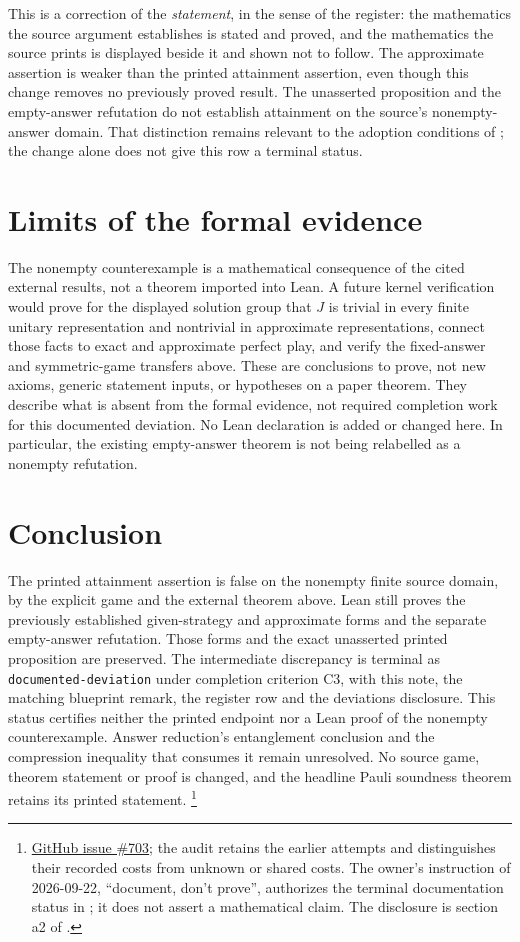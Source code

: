 \documentclass[11pt]{article}
\renewcommand{\ghissue}[1]{%
  \href{https://github.com/Dengnifer/MIPStarRE-QPBT/issues/#1}{GitHub issue \##1}}
\begin{document}
This is a correction of the \emph{statement}, in the sense of the register:
the mathematics the source argument establishes is stated and proved, and the
mathematics the source prints is displayed beside it and shown not to follow.
The approximate assertion is weaker than the printed attainment assertion,
even though this change removes no previously proved result. The unasserted
proposition and the empty-answer refutation do not establish attainment on the
source's nonempty-answer domain. That distinction remains relevant to the
adoption conditions of ; the change alone
does not give this row a terminal status.

\section{Limits of the formal evidence}

The nonempty counterexample is a mathematical consequence of the cited
external results, not a theorem imported into Lean. A future kernel verification
would prove for the displayed solution group that $J$ is trivial in every finite
unitary representation and nontrivial in approximate representations, connect
those facts to exact and approximate perfect play, and verify the fixed-answer
and symmetric-game transfers above. These are conclusions to prove, not new
axioms, generic statement inputs, or hypotheses on a paper theorem. They
describe what is absent from the formal evidence, not required completion work
for this documented deviation. No Lean declaration is added or changed here.
In particular, the existing empty-answer theorem is not being relabelled as a
nonempty refutation.

\section{Conclusion}

The printed attainment assertion is false on the nonempty finite source
domain, by the explicit game and the external theorem above. Lean still
proves the previously established given-strategy and approximate forms and
the separate empty-answer refutation. Those forms and the exact unasserted
printed proposition are preserved. The intermediate discrepancy is terminal
as \texttt{documented-deviation} under completion criterion C3, with this note,
the matching blueprint remark, the register row and the deviations disclosure.
This status certifies neither the printed endpoint nor a Lean proof of the
nonempty counterexample. Answer reduction's entanglement conclusion and the
compression inequality that consumes it remain unresolved. No source game,
theorem statement or proof is changed, and the headline Pauli soundness theorem
retains its printed statement.%
\footnote{\ghissue{703}; the audit retains the earlier attempts and distinguishes
their recorded costs from unknown or shared costs. The owner's instruction of
2026-09-22, ``document, don't prove'', authorizes the terminal documentation
status in ; it does not assert a mathematical
claim. The disclosure is section a2 of .}



\end{document}
